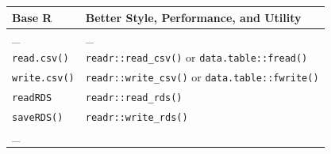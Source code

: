 \documentclass[]{book}
\begin{document}
\begin{longtable}[]{@{}ll@{}}
\toprule
\begin{minipage}[b]{0.05\columnwidth}\raggedright\strut
Base R\strut
\end{minipage} & \begin{minipage}[b]{0.05\columnwidth}\raggedright\strut
Better Style, Performance, and Utility\strut
\end{minipage}\tabularnewline
\midrule
\endhead
\begin{minipage}[t]{0.05\columnwidth}\raggedright\strut
\_\strut
\end{minipage} & \begin{minipage}[t]{0.05\columnwidth}\raggedright\strut
\_\strut
\end{minipage}\tabularnewline
\begin{minipage}[t]{0.05\columnwidth}\raggedright\strut
\texttt{read.csv()}\strut
\end{minipage} & \begin{minipage}[t]{0.05\columnwidth}\raggedright\strut
\texttt{readr::read\_csv()} or \texttt{data.table::fread()}\strut
\end{minipage}\tabularnewline
\begin{minipage}[t]{0.05\columnwidth}\raggedright\strut
\texttt{write.csv()}\strut
\end{minipage} & \begin{minipage}[t]{0.05\columnwidth}\raggedright\strut
\texttt{readr::write\_csv()} or \texttt{data.table::fwrite()}\strut
\end{minipage}\tabularnewline
\begin{minipage}[t]{0.05\columnwidth}\raggedright\strut
\texttt{readRDS}\strut
\end{minipage} & \begin{minipage}[t]{0.05\columnwidth}\raggedright\strut
\texttt{readr::read\_rds()}\strut
\end{minipage}\tabularnewline
\begin{minipage}[t]{0.05\columnwidth}\raggedright\strut
\texttt{saveRDS()}\strut
\end{minipage} & \begin{minipage}[t]{0.05\columnwidth}\raggedright\strut
\texttt{readr::write\_rds()}\strut
\end{minipage}\tabularnewline
\begin{minipage}[t]{0.05\columnwidth}\raggedright\strut
\_\strut
\end{minipage} & \begin{minipage}[t]{0.05\columnwidth}\raggedright\strut

\end{minipage}
\end{longtable}
\end{document}
